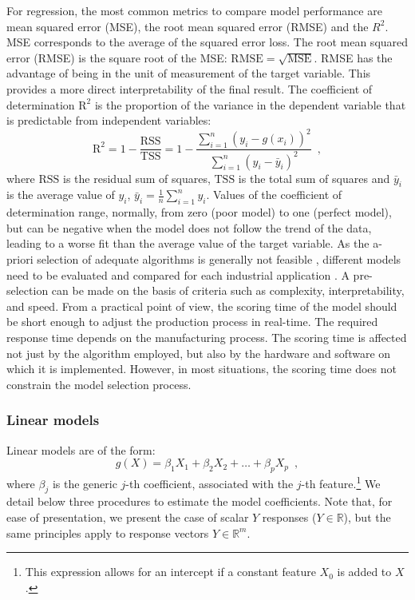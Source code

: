 For regression, the most common metrics to compare model performance are mean squared error (MSE), the root mean squared error (RMSE) and the $R^2$. MSE corresponds to the average of the squared error loss. The root mean squared error (RMSE) is the square root of the MSE: $\mathrm{RMSE} = \sqrt{\mathrm{MSE}}$. RMSE has the advantage of being in the unit of measurement of the target variable. This provides a more direct interpretability of the final result.
The coefficient of determination $\mathrm{R}^\mathrm{2}$ is the proportion of the variance in the dependent variable that is predictable from independent variables:
\begin{equation*}
    \mathrm{R}^2 = 1 - \frac{\mathrm{RSS}}{\mathrm{TSS}} = 1 - \frac{\sum_{i=1}^{n} (y_{i} - g(x_i))^{2} }{\sum_{i=1}^{n} (y_{i} - \bar{y}_{i})^{2}}
    \enspace,
\end{equation*}
where $\mathrm{RSS}$ is the residual sum of squares, $\mathrm{TSS}$ is the total sum of squares and $\bar{y}_{i}$ is the average value of $y_{i}$, $\bar{y}_{i} = \frac{1}{n} \sum_{i=1}^{n} y_{i}$. Values of the coefficient of determination range, normally, from zero (poor model) to one (perfect model), but can be negative when the model does not follow the trend of the data, leading to a worse fit than the average value of the target variable.
As the a-priori selection of adequate algorithms is generally not feasible \citep{kotthoff2016algorithm}, different models need to be evaluated and compared for each industrial application \citep{lee2020machine}. A pre-selection can be made on the basis of criteria such as complexity, interpretability, and speed. 
From a practical point of view, the scoring time of the model should be short enough to adjust the production process in real-time. The required response time depends on the manufacturing process. The scoring time is affected not just by the algorithm employed, but also by the hardware and software on which it is implemented. However, in most situations, the scoring time does not constrain the model selection process.


\subsubsection{Linear models} \label{Parametric models}

Linear models are of the form:
\begin{equation} \label{eq:linear_function}
    g(X) = \beta_1X_1 + \beta_2X_2 + \ldots + \beta_pX_p
    \enspace,
\end{equation}
where $\beta_j$ is the generic $j$-th coefficient, associated with the $j$-th feature.\footnote{%
This expression allows for an intercept if a constant feature $X_0$ is added to $X$.}
We detail below three procedures to estimate the model coefficients. 
Note that, for ease of presentation, we present the case of scalar $Y$ responses ($Y\in \mathds{R}$), but the same principles apply to response vectors $Y \in \mathds{R}^{m}$.


